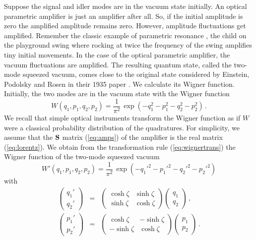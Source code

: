 \documentclass[12pt,amsmath,amssymb]{article}
\def\underline#1{{\bf #1}}
\numberwithin{equation}{section}
\begin{document}
Suppose the signal and idler modes are in the vacuum state
initially. An optical parametric amplifier is just an
amplifier after all. So, if the initial amplitude is zero the
amplified amplitude remains zero. However, amplitude
fluctuations get amplified. Remember the classic example of
parametric resonance \cite{LL1}, the
child on the playground swing where rocking at twice
the frequency of the swing amplifies tiny initial movements.
In the case of the optical parametric amplifier,
the vacuum fluctuations are amplified.
The resulting quantum state, called the two-mode squeezed vacuum,
comes close to the original state considered by Einstein, Podolsky
and Rosen in their 1935 paper \cite{EPR}.
We calculate its Wigner function.
Initially, the two modes are in the vacuum state with the
Wigner function \cite{Leonhardt}
\begin{equation}
W(q_1,p_1,q_2,p_2) = \frac{1}{\pi^2}\,
\exp\left(-q_1^2-p_1^2-q_2^2-p_2^2\right) \,.
\end{equation}
We recall that simple optical instruments transform the Wigner function
as if $W$ were a classical probability distribution of the quadratures.
For simplicity, we assume that the $\underline{S}$ matrix
(\ref{eq:amps}) of the amplifier is the real matrix (\ref{eq:lorentz}).
We obtain from the transformation rule (\ref{eq:wignertrans})
the Wigner function of the two-mode squeezed vacuum
\begin{equation}
W'(q_1,p_1,q_2,p_2) =
\frac{1}{\pi^2}\, \exp\left(-q_1'^2-p_1'^2-q_2'^2-p_2'^2\right)
\end{equation}
with
\begin{eqnarray}
\left(
    \begin{array}{c}
     q_1'  \\
     q_2'
    \end{array}
\right)& =&
\left(
    \begin{array}{cc}
      \cosh\zeta & \sinh\zeta \\
      \sinh\zeta & \cosh\zeta
    \end{array}
\right)
\left(
    \begin{array}{c}
     q_1  \\
     q_2
    \end{array}
\right)\,,
\nonumber\\
\left(
    \begin{array}{c}
     p_1'  \\
     p_2'
    \end{array}
\right) &=&
\left(
    \begin{array}{cc}
      \cosh\zeta & -\sinh\zeta \\
      -\sinh\zeta & \cosh\zeta
    \end{array}
\right)
\left(
    \begin{array}{c}
     p_1  \\
     p_2
    \end{array}
\right)\,.
\end{eqnarray}
\end{document}
